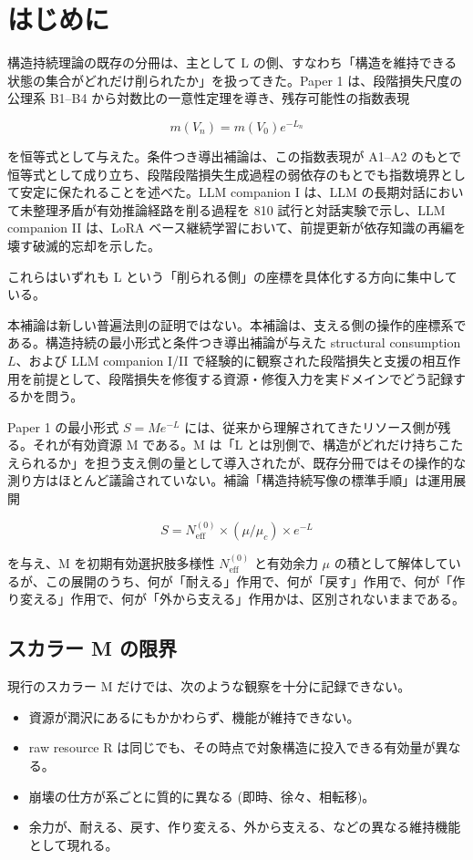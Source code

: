 \documentclass[12pt,a4paper]{article}
\begin{document}
\section{はじめに}\label{ux306fux3058ux3081ux306b}

構造持続理論の既存の分冊は、主として L の側、すなわち「構造を維持できる状態の集合がどれだけ削られたか」を扱ってきた。Paper 1 は、段階損失尺度の公理系 B1--B4 から対数比の一意性定理を導き、残存可能性の指数表現

\[
m(V_{n}) = m(V_0) e^{-L_{n}}
\]

を恒等式として与えた。条件つき導出補論は、この指数表現が A1--A2 のもとで恒等式として成り立ち、段階段階損失生成過程の弱依存のもとでも指数境界として安定に保たれることを述べた。LLM companion I は、LLM の長期対話において未整理矛盾が有効推論経路を削る過程を 810 試行と対話実験で示し、LLM companion II は、LoRA ベース継続学習において、前提更新が依存知識の再編を壊す破滅的忘却を示した。

これらはいずれも L という「削られる側」の座標を具体化する方向に集中している。

本補論は新しい普遍法則の証明ではない。本補論は、支える側の操作的座標系である。構造持続の最小形式と条件つき導出補論が与えた structural consumption \(L\)、および LLM companion I/II で経験的に観察された段階損失と支援の相互作用を前提として、段階損失を修復する資源・修復入力を実ドメインでどう記録するかを問う。

Paper 1 の最小形式 \(S = M e^{-L}\) には、従来から理解されてきたリソース側が残る。それが有効資源 M である。M は「L とは別側で、構造がどれだけ持ちこたえられるか」を担う支え側の量として導入されたが、既存分冊ではその操作的な測り方はほとんど議論されていない。補論「構造持続写像の標準手順」は運用展開

\[
S = N_{\mathrm{eff}}^{(0)} \times (\mu / \mu_{c}) \times e^{-L}
\]

を与え、M を初期有効選択肢多様性 \(N_{\mathrm{eff}}^{(0)}\) と有効余力 \(\mu\) の積として解体しているが、この展開のうち、何が「耐える」作用で、何が「戻す」作用で、何が「作り変える」作用で、何が「外から支える」作用かは、区別されないままである。

\subsection{スカラー M の限界}\label{ux30b9ux30abux30e9ux30fc-m-ux306eux9650ux754c}

現行のスカラー M だけでは、次のような観察を十分に記録できない。

\begin{itemize}
\tightlist
\item
  資源が潤沢にあるにもかかわらず、機能が維持できない。
\item
  raw resource R は同じでも、その時点で対象構造に投入できる有効量が異なる。
\item
  崩壊の仕方が系ごとに質的に異なる (即時、徐々、相転移)。
\item
  余力が、耐える、戻す、作り変える、外から支える、などの異なる維持機能として現れる。
\end{itemize}
\end{document}
